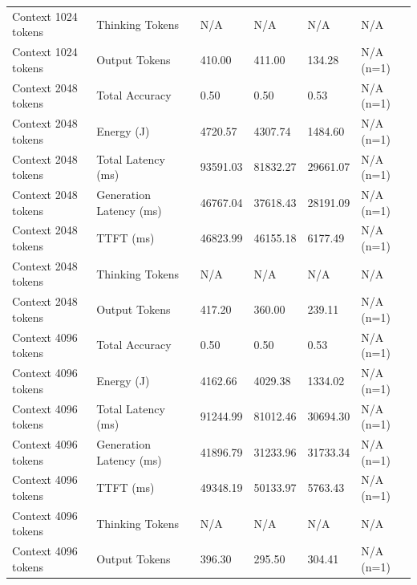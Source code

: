\begin{table}
\begin{tabular}{llllll}
Context 1024 tokens & Thinking Tokens & N/A & N/A & N/A & N/A \\
Context 1024 tokens & Output Tokens & 410.00 & 411.00 & 134.28 & N/A (n=1) \\
Context 2048 tokens & Total Accuracy & 0.50 & 0.50 & 0.53 & N/A (n=1) \\
Context 2048 tokens & Energy (J) & 4720.57 & 4307.74 & 1484.60 & N/A (n=1) \\
Context 2048 tokens & Total Latency (ms) & 93591.03 & 81832.27 & 29661.07 & N/A (n=1) \\
Context 2048 tokens & Generation Latency (ms) & 46767.04 & 37618.43 & 28191.09 & N/A (n=1) \\
Context 2048 tokens & TTFT (ms) & 46823.99 & 46155.18 & 6177.49 & N/A (n=1) \\
Context 2048 tokens & Thinking Tokens & N/A & N/A & N/A & N/A \\
Context 2048 tokens & Output Tokens & 417.20 & 360.00 & 239.11 & N/A (n=1) \\
Context 4096 tokens & Total Accuracy & 0.50 & 0.50 & 0.53 & N/A (n=1) \\
Context 4096 tokens & Energy (J) & 4162.66 & 4029.38 & 1334.02 & N/A (n=1) \\
Context 4096 tokens & Total Latency (ms) & 91244.99 & 81012.46 & 30694.30 & N/A (n=1) \\
Context 4096 tokens & Generation Latency (ms) & 41896.79 & 31233.96 & 31733.34 & N/A (n=1) \\
Context 4096 tokens & TTFT (ms) & 49348.19 & 50133.97 & 5763.43 & N/A (n=1) \\
Context 4096 tokens & Thinking Tokens & N/A & N/A & N/A & N/A \\
Context 4096 tokens & Output Tokens & 396.30 & 295.50 & 304.41 & N/A (n=1) \\
\bottomrule
\end{tabular}
\end{table}
